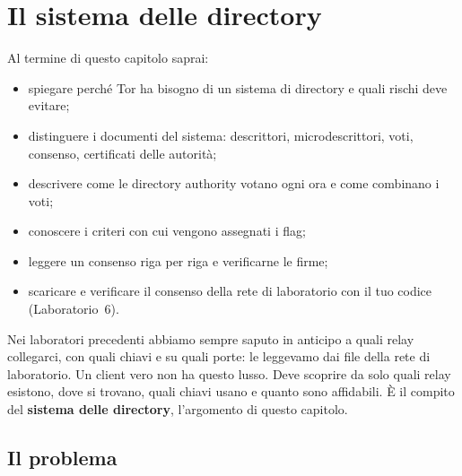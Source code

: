 \chapter{Il sistema delle directory}\label{cap:12-directory}

\begin{obiettivi}
Al termine di questo capitolo saprai:
\begin{itemize}[nosep]
  \item spiegare perché Tor ha bisogno di un sistema di directory e quali rischi deve evitare;
  \item distinguere i documenti del sistema: descrittori, microdescrittori, voti, consenso, certificati delle autorità;
  \item descrivere come le directory authority votano ogni ora e come combinano i voti;
  \item conoscere i criteri con cui vengono assegnati i flag;
  \item leggere un consenso riga per riga e verificarne le firme;
  \item scaricare e verificare il consenso della rete di laboratorio con il tuo codice (Laboratorio~6).
\end{itemize}
\end{obiettivi}

Nei laboratori precedenti abbiamo sempre saputo in anticipo a quali relay collegarci, con quali chiavi e su quali porte: le leggevamo dai file della rete di laboratorio. Un client vero non ha questo lusso. Deve scoprire da solo quali relay esistono, dove si trovano, quali chiavi usano e quanto sono affidabili. È il compito del \textbf{sistema delle directory}, l'argomento di questo capitolo.

\section{Il problema}\label{sec:dir-problema}

